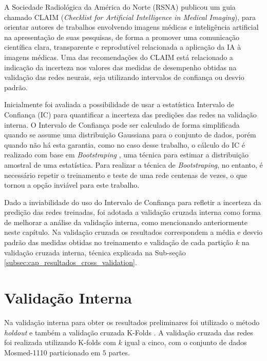 A Sociedade Radiológica da América do Norte (RSNA) publicou um guia chamado CLAIM\cite{mongan2020checklist} (\textit{Checklist for Artificial Intelligence in Medical Imaging}), para orientar autores de trabalhos envolvendo imagens médicas e inteligência artificial na apresentação de suas pesquisas, de forma a promover uma comunicação científica clara, transparente e reprodutível relacionada a aplicação da IA à imagens médicas. Uma das recomendações do CLAIM está relacionado a indicação da incerteza nos valores das medidas de desempenho obtidas na validação das redes neurais, seja utilizando intervalos de confiança ou desvio padrão. 

Inicialmente foi avaliada a possibilidade de usar a estatística Intervalo de Confiança (IC) para quantificar a incerteza das predições das redes na validação interna. O Intervalo de Confiança pode ser calculado de forma simplificada quando se assume uma distribuição Gaussiana para o conjunto de dados, porém quando não há esta garantia, como no caso desse trabalho, o cálculo do IC é realizado com base em \textit{Bootstraping} \cite{mooney1993bootstrapping}, uma técnica para estimar a distribuição amostral de uma estatística. Para realizar a técnica de \textit{Bootstraping}, no entanto, é necessário repetir o treinamento e teste de uma rede centenas de vezes, o que tornou a opção inviável para este trabalho. 

Dado a inviabilidade do uso do Intervalo de Confiança para refletir a incerteza da predição das redes treinadas, foi adotada a validação cruzada interna como forma de melhorar a análise da validação interna, como mencionando anteriormente neste capítulo. Na validação cruzada os resultados correspondem a média e desvio padrão das medidas obtidas no treinamento e validação de cada partição $k$ na validação cruzada interna, técnica explicada na Sub-seção \ref{subsec:cap_resultados_cross_validation}. 

\section{Validação Interna}\label{sec:cap_resultados_internal_validation}

Na validação interna para obter os resultados preliminares foi utilizado o método \textit{holdout} e também a validação cruzada K-Folds \cite{anguita2012k}. A validação cruzada das redes foi realizada utilizando K-folds com $k$ igual a cinco, com o conjunto de dados Mosmed-1110 particionado em $5$ partes.

